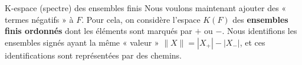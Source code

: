 \documentclass[12pt]{beamer}
\begin{document}
\begin{frame}{K-espace (spectre) des ensembles finis}
  Nous voulons maintenant ajouter des « termes négatifs » à $F$. Pour cela, on considère l’espace $K(F)$ des \textbf{ensembles finis ordonnés} dont les éléments sont marqués par $+$ ou $-$. Nous identifions les ensembles signés ayant la même « valeur » $\|X\|=|X_+|-|X_-|$, et ces identifications sont représentées par des chemins.
\pause
\begin{center}



\begin{tikzpicture}[x=0.75pt,y=0.75pt,yscale=-1,xscale=1]


\end{tikzpicture}
\end{center}
\end{frame}
\end{document}
